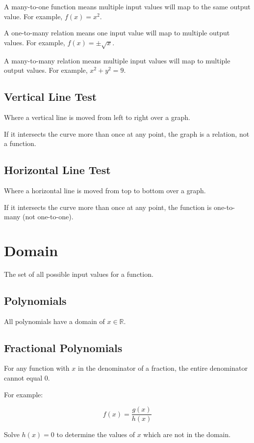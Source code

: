 \documentclass[a4paper,11pt]{report}
\begin{document}
A many-to-one function means multiple input values will map to the same output
value. For example, $f(x) = x^2$.

A one-to-many relation means one input value will map to multiple output values.
For example, $f(x) = \pm \sqrt{x}$.

A many-to-many relation means multiple input values will map to multiple output
values. For example, $x^2 + y^2 = 9$.

\subsection{Vertical Line Test}

Where a vertical line is moved from left to right over a graph.

If it intersects the curve more than once at any point, the graph is a relation,
not a function.

\subsection{Horizontal Line Test}

Where a horizontal line is moved from top to bottom over a graph.

If it intersects the curve more than once at any point, the function is
one-to-many (not one-to-one).


\section{Domain}

The set of all possible input values for a function.

\subsection{Polynomials}

All polynomials have a domain of $x \in \mathbb{R}$.

\subsection{Fractional Polynomials}

For any function with $x$ in the denominator of a fraction, the entire
denominator cannot equal 0.

For example:

$$
f(x) = \frac{g(x)}{h(x)}
$$

Solve $h(x) = 0$ to determine the values of $x$ which are not in the domain.
\end{document}
